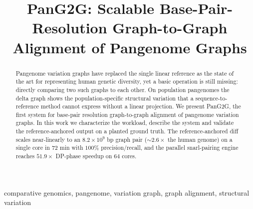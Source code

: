 \documentclass[conference]{IEEEtran}
\theoremstyle{definition}
\begin{document}
\title{PanG2G: Scalable Base-Pair-Resolution Graph-to-Graph
Alignment of Pangenome Graphs
}


\author{
}

\maketitle

\begin{abstract}
Pangenome variation graphs have replaced the single linear reference as the state of the art for representing human genetic diversity, yet a basic operation is still missing: directly comparing two such graphs to each other. On population pangenomes the delta graph shows the population-specific structural variation that a sequence-to-reference method cannot express without a linear projection. We present PanG2G, the first system for base-pair resolution graph-to-graph alignment of pangenome variation graphs. In this work we characterize the workload, describe the system and validate the reference-anchored output on a planted ground truth. The reference-anchored diff scales near-linearly to an $8.2{\times}10^9$ bp graph pair (${\sim}2.6\times$ the human genome) on a single core in 72 min with $100\%$ precision/recall, and the parallel snarl-pairing engine reaches $51.9\times$ DP-phase speedup on $64$ cores.
\end{abstract}

\begin{IEEEkeywords}
comparative genomics, pangenome, variation graph, graph alignment, structural variation
\end{IEEEkeywords}










\end{document}
